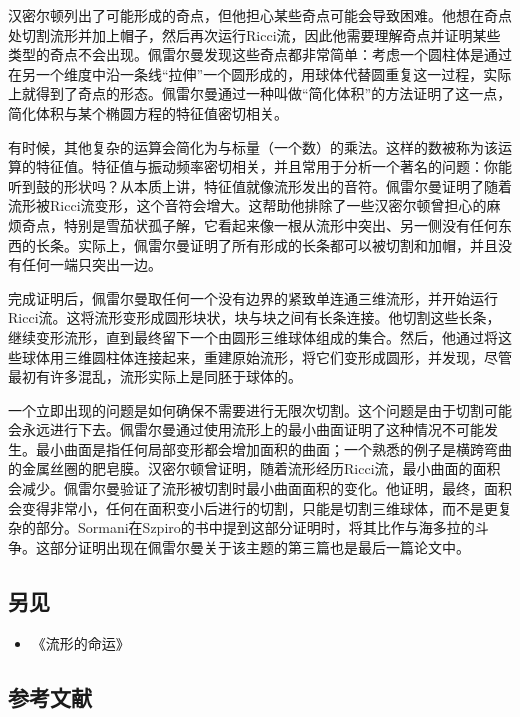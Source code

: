 汉密尔顿列出了可能形成的奇点，但他担心某些奇点可能会导致困难。他想在奇点处切割流形并加上帽子，然后再次运行Ricci流，因此他需要理解奇点并证明某些类型的奇点不会出现。佩雷尔曼发现这些奇点都非常简单：考虑一个圆柱体是通过在另一个维度中沿一条线“拉伸”一个圆形成的，用球体代替圆重复这一过程，实际上就得到了奇点的形态。佩雷尔曼通过一种叫做“简化体积”的方法证明了这一点，简化体积与某个椭圆方程的特征值密切相关。

有时候，其他复杂的运算会简化为与标量（一个数）的乘法。这样的数被称为该运算的特征值。特征值与振动频率密切相关，并且常用于分析一个著名的问题：你能听到鼓的形状吗？从本质上讲，特征值就像流形发出的音符。佩雷尔曼证明了随着流形被Ricci流变形，这个音符会增大。这帮助他排除了一些汉密尔顿曾担心的麻烦奇点，特别是雪茄状孤子解，它看起来像一根从流形中突出、另一侧没有任何东西的长条。实际上，佩雷尔曼证明了所有形成的长条都可以被切割和加帽，并且没有任何一端只突出一边。

完成证明后，佩雷尔曼取任何一个没有边界的紧致单连通三维流形，并开始运行Ricci流。这将流形变形成圆形块状，块与块之间有长条连接。他切割这些长条，继续变形流形，直到最终留下一个由圆形三维球体组成的集合。然后，他通过将这些球体用三维圆柱体连接起来，重建原始流形，将它们变形成圆形，并发现，尽管最初有许多混乱，流形实际上是同胚于球体的。

一个立即出现的问题是如何确保不需要进行无限次切割。这个问题是由于切割可能会永远进行下去。佩雷尔曼通过使用流形上的最小曲面证明了这种情况不可能发生。最小曲面是指任何局部变形都会增加面积的曲面；一个熟悉的例子是横跨弯曲的金属丝圈的肥皂膜。汉密尔顿曾证明，随着流形经历Ricci流，最小曲面的面积会减少。佩雷尔曼验证了流形被切割时最小曲面面积的变化。他证明，最终，面积会变得非常小，任何在面积变小后进行的切割，只能是切割三维球体，而不是更复杂的部分。Sormani在Szpiro的书中提到这部分证明时，将其比作与海多拉的斗争。这部分证明出现在佩雷尔曼关于该主题的第三篇也是最后一篇论文中。
\subsection{另见}  
\begin{itemize}
\item 《流形的命运》 
\end{itemize} 
\subsection{参考文献}
